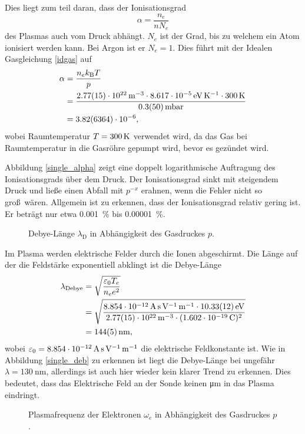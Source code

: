 Dies liegt zum teil daran, dass der Ionisationsgrad
\begin{equation}
\alpha=\frac{n_e}{n N_e}\label{defalpha}
\end{equation}
des Plasmas auch vom Druck abh\"angt.
$N_e$ ist der Grad, bis zu welchem ein Atom ionisiert werden kann.
Bei Argon ist er $N_e=1$.
Dies f\"uhrt mit der Idealen Gasgleichung \vref{idgas} auf
\begin{align}
\alpha
    &= \frac{n_e k_\text{B} T}{p}\label{salpha}\\
    &= \frac{\siAnea\cdot\sik\cdot\siTroom}{\siApa}\nonumber\\
    &= \siAalphaa\nonumber,
\end{align}
wobei Raumtemperatur $T=\SI{300}{\kelvin}$ verwendet wird, da das Gas bei Raumtemperatur in die Gasr\"ohre gepumpt wird, bevor es gez\"undet wird.

Abbildung \vref{single_alpha} zeigt eine doppelt logarithmische Auftragung des Ionisationsgrads \"uber dem Druck.
Der Ionisationsgrad sinkt mit steigendem Druck und lie\ss e einen Abfall mit $p^{-x}$ erahnen, wenn die Fehler nicht so gro\ss\ w\"aren.
Allgemein ist zu erkennen, dass der Ionisationsgrad relativ gering ist.
Er betr\"agt nur etwa \SI{0.001}{\percent} bis \SI{0.00001}{\percent}.

\begin{figure}[htbp]
    \centering
    
    \caption{
        Debye-L\"ange $\lambda_\text{D}$ in Abh\"angigkeit des Gasdruckes $p$.
    }
    \label{single_deb}
\end{figure}

Im Plasma werden elektrische Felder durch die Ionen abgeschirmt.
Die L\"ange auf der die Feldst\"arke exponentiell abklingt ist die Debye-L\"ange
\begin{align}
\lambda_\text{Debye}
    &=\sqrt{\frac{\varepsilon_0 T_e}{n_e e^2}}
    \label{sdeb}\\
    &=\sqrt{\frac{\sieO \cdot\siATea}{\siAnea\cdot(\sie)^2}} \nonumber\\
    &=\siAdeba\nonumber,
\end{align}
wobei $\varepsilon_0=\SI{8.854e-12}{\ampere\second\per\volt\per\metre}$ die elektrische Feldkonstante ist.
Wie in Abbildung \vref{single_deb} zu erkennen ist liegt die Debye-L\"ange bei ungef\"ahr $\lambda =\SI{130}{\nano\metre}$, allerdings ist auch hier wieder kein klarer Trend zu erkennen.
Dies bedeutet, dass das Elektrische Feld an der Sonde keinen \si{\micro\metre} in das Plasma eindringt.

\begin{figure}[htbp]
\centering

\caption{
    Plasmafrequenz der Elektronen $\omega_e$ in Abh\"angigkeit des Gasdruckes $p$.
}
\label{single_wpe}
\end{figure}

